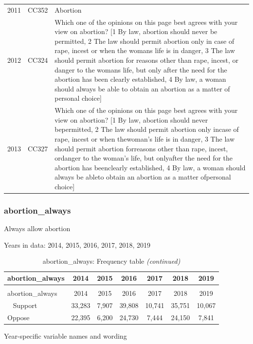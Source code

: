 \documentclass[12pt]{article}
\begin{document}
\begin{longtable}[t]{rl>{\raggedright\arraybackslash}p{10cm}}
2011 & CC352 & Abortion\\
2012 & CC324 & Which one of the opinions on this page best agrees with your view on abortion? [1 By law, abortion should never be permitted, 2 The law should permit abortion only in case of rape, incest or when the womans life is in danger, 3 The law should permit abortion for reasons other than rape, incest, or danger to the womans life, but only after the need for the abortion has been clearly established, 4 By law, a woman should always be able to obtain an abortion as a matter of personal choice]\\
2013 & CC327 & Which one of the opinions on this page best agrees with your view on abortion? [1 By law, abortion should never bepermitted, 2 The law should permit abortion only incase of rape, incest or when thewoman's life is in danger, 3 The law should permit abortion forreasons other than rape, incest, ordanger to the woman's life, but onlyafter the need for the abortion has beenclearly established, 4 By law, a woman should always be ableto obtain an abortion as a matter ofpersonal choice]\\*
\end{longtable}

\subsubsection{abortion\_always}\label{abortion_always}

Always allow abortion

Years in data: 2014, 2015, 2016, 2017, 2018, 2019

\begin{longtable}[t]{lcccccc}
\caption{\label{tab:unnamed-chunk-4}abortion\_always: Frequency table}\\
\toprule
abortion\_always & 2014 & 2015 & 2016 & 2017 & 2018 & 2019\\
\midrule
\endfirsthead
\caption[]{abortion\_always: Frequency table \textit{(continued)}}\\
\toprule
abortion\_always & 2014 & 2015 & 2016 & 2017 & 2018 & 2019\\
\midrule
\endhead
\
\endfoot
\bottomrule
\endlastfoot
Support & 33,283 & 7,907 & 39,808 & 10,741 & 35,751 & 10,067\\
Oppose & 22,395 & 6,200 & 24,730 & 7,444 & 24,150 & 7,841\\*
\end{longtable}

Year-specific variable names and wording
\end{document}
